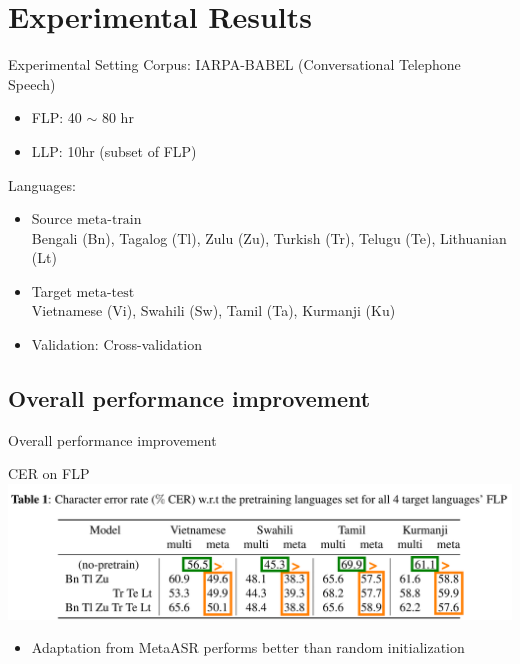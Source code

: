 \documentclass{beamer}
\begin{document}
\section{Experimental Results}
\begin{frame}[t]{Experimental Setting}
  Corpus: IARPA-BABEL (Conversational Telephone Speech)
  \begin{itemize}
    \item FLP: 40 $\sim$ 80 hr
    \item LLP: 10hr (subset of FLP)
  \end{itemize}
  \pause
  Languages:
  \begin{itemize}
    \item Source $\boxed{\text{meta-train}}$\\ Bengali (Bn), Tagalog (Tl), Zulu (Zu), Turkish (Tr), Telugu (Te), Lithuanian (Lt)
    \item Target $\boxed{\text{meta-test}}$ \\Vietnamese (Vi), Swahili (Sw), Tamil (Ta), Kurmanji (Ku)
    \item Validation: Cross-validation
  \end{itemize}
\end{frame}

\subsection{Overall performance improvement}
\begin{frame}
	\begin{center}
    \LARGE{Overall performance improvement}
	\end{center}
\end{frame}
\begin{frame}[t]{CER on FLP}
  \center \includegraphics[width=1.0\textwidth]{fig/flp-hl1.png}

  \begin{itemize}
    \item Adaptation from MetaASR performs better than random initialization
  \end{itemize}
\end{frame}
\end{document}

